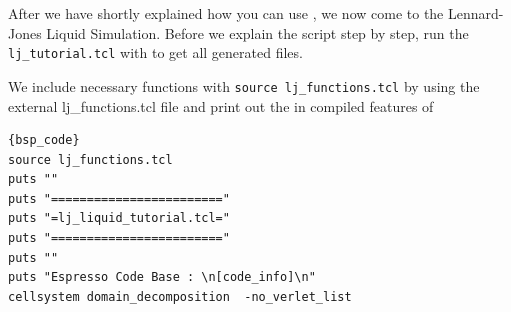 \documentclass[
paper=a4,                       %
fontsize=11pt,                  %
twoside,                        %
footsepline,                    %
headsepline,                    %
headinclude=false,              %
footinclude=false,              %
pagesize,                       %
]{scrartcl}
\begin{document}
   
After we have shortly explained how you can use \es{}, we now come to the Lennard-Jones Liquid Simulation. 
Before we explain the script step by step, run the \texttt{lj\_tutorial.tcl}  with \es{} to get all generated files.
   

We include necessary functions with  \lstinline|source lj_functions.tcl| by using the external lj\_functions.tcl file and print out the in compiled features of \es
{\small\vspace{0,2cm}
\begin{lstlisting}{bsp_code}
source lj_functions.tcl
puts ""
puts "========================"
puts "=lj_liquid_tutorial.tcl="
puts "========================"
puts ""
puts "Espresso Code Base : \n[code_info]\n"
cellsystem domain_decomposition  -no_verlet_list
\end{lstlisting}}\vspace{0,2cm}
\end{document}

